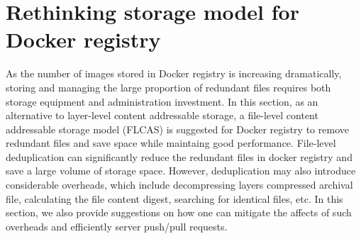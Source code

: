 \section{Rethinking storage model for Docker registry}
\label{sec:file_adressable}
%
%
As the number of images stored in Docker registry is increasing dramatically,
storing and managing the large proportion of redundant files requires both
storage equipment and administration investment.  In this section, as an
alternative to layer-level content addressable storage, a file-level content
addressable storage model (FLCAS) is suggested for Docker registry to remove
redundant files and save space while maintaing good performance.  File-level
deduplication can significantly reduce the redundant files in docker registry
and save a large volume of storage space.  However, deduplication may also
introduce considerable overheads, which include decompressing layers compressed
archival file, calculating the file content digest, searching for identical
files, etc. 
In this section, we also provide suggestions on how one can
mitigate the affects of such overheads and efficiently server push/pull requests. 


